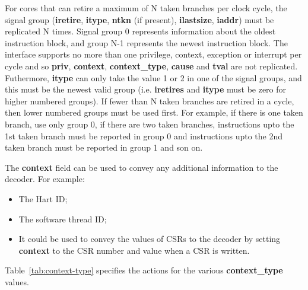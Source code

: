 For cores that can retire a maximum of N taken branches per clock
cycle, the signal group (\textbf{iretire}, \textbf{itype},
\textbf{ntkn} (if present), \textbf{ilastsize}, \textbf{iaddr}) must be replicated N times. Signal group 0
represents information about the oldest instruction block, and group N-1
represents the newest instruction block. The interface supports no more
than one privilege, context, exception or interrupt per cycle and so \textbf{priv}, 
\textbf{context}, \textbf{context\_type}, \textbf{cause} and
\textbf{tval} are not replicated. Futhermore, \textbf{itype} can only
take the value 1 or 2 in one of the signal groups, and this must be
the newest valid group (i.e. \textbf{iretires} and \textbf{itype} must
be zero for higher numbered groups). If fewer than N taken branches
are retired in a cycle, then lower numbered groups must be used
first. For example, if there is one taken branch, use only group 0, if
there are two taken branches, instructions upto the 1st taken branch
must be reported in group 0 and instructions upto the 2nd taken branch
must be reported in group 1 and son on.

The \textbf{context} field can be used to convey any additional information to the decoder.  For example:

\begin{itemize}
  \item The Hart ID;
  \item The software thread ID;
  \item It could be used to convey the values of CSRs to the decoder by setting \textbf{context} to the 
    CSR number and value when a CSR is written.
\end{itemize}

Table~\ref{tab:context-type} specifies the actions for the various \textbf{context\_type} values.

